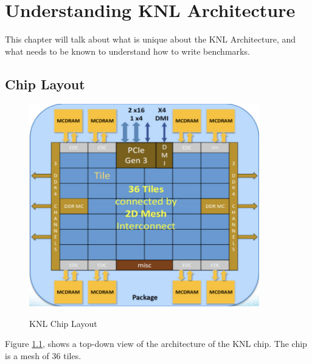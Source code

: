\documentclass[bsc,frontabs,twoside,singlespacing,parskip,deptreport]{infthesis}     %
\begin{document}
\chapter{Understanding KNL Architecture}
This chapter will talk about what is unique about the KNL Architecture, and what needs to be known to understand how to write benchmarks.
\section{Chip Layout}
\begin{figure}[h]
    \includegraphics[width=10cm]{KNL_Overview.png}
    \centering
    \caption{KNL Chip Layout}
    \protect\cite{intel_pres}
    \label{fig:chip-overview}
\end{figure}
Figure \ref{fig:chip-overview}, shows a top-down view of the architecture of the KNL chip. The chip is a mesh of 36 tiles.
\end{document}
